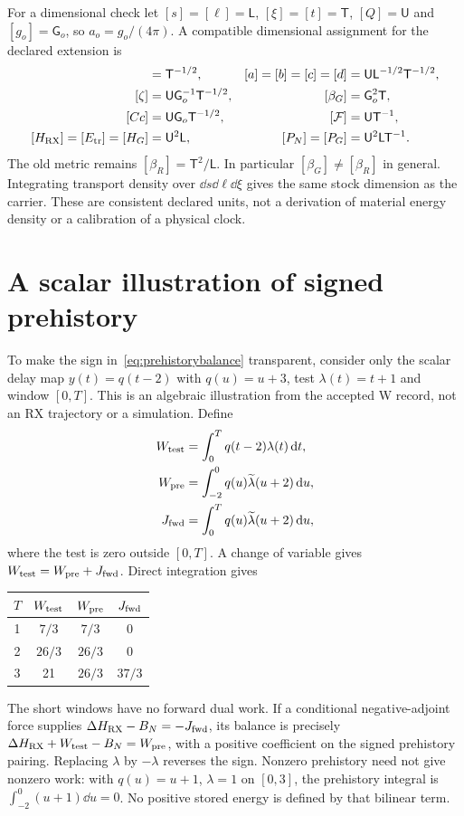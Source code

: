 For a dimensional check let $[s]=[\ell]=\mathsf L$, $[\xi]=[t]=\mathsf T$, $[Q]=\mathsf U$ and $[g_o]=\mathsf G_o$, so $a_o=g_o/(4\pi)$. A compatible dimensional assignment for the declared extension is
\begin{align}
[\kappa]&=\mathsf T^{-1/2},&
[a]=[b]=[c]=[d]&=\mathsf U\mathsf L^{-1/2}\mathsf T^{-1/2},\notag\\
[\zeta]&=\mathsf U\mathsf G_o^{-1}\mathsf T^{-1/2},&
[\beta_G]&=\mathsf G_o^2\mathsf T,\notag\\
[Cc]&=\mathsf U\mathsf G_o\mathsf T^{-1/2},&
[\FF]&=\mathsf U\mathsf T^{-1},\label{eq:units}\\
[H_{\rm RX}]=[E_{\rm tr}]=[H_G]&=\mathsf U^2\mathsf L,&
[P_N]=[P_G]&=\mathsf U^2\mathsf L\mathsf T^{-1}.\notag
\end{align}
The old metric remains $[\beta_R]=\mathsf T^2/\mathsf L$. In particular $[\beta_G]\ne[\beta_R]$ in general. Integrating transport density over $\dd s\dd\ell\dd\xi$ gives the same stock dimension as the carrier. These are consistent declared units, not a derivation of material energy density or a calibration of a physical clock.

\section{A scalar illustration of signed prehistory}\label{app:example}
To make the sign in~\eqref{eq:prehistorybalance} transparent, consider only the scalar delay map $y(t)=q(t-2)$ with $q(u)=u+3$, test $\lambda(t)=t+1$ and window $[0,T]$. This is an algebraic illustration from the accepted W record, not an RX trajectory or a simulation. Define
\begin{align*}
W_{\rm test}&=\int_0^Tq(t-2)\lambda(t)\,\mathrm d t,\\
W_{\rm pre}&=\int_{-2}^0q(u)\widetilde\lambda(u+2)\,\mathrm d u,\\
J_{\rm fwd}&=\int_0^Tq(u)\widetilde\lambda(u+2)\,\mathrm d u,
\end{align*}
where the test is zero outside $[0,T]$. A change of variable gives $W_{\rm test}=W_{\rm pre}+J_{\rm fwd}$. Direct integration gives
\begin{center}\begin{tabular}{cccc}\toprule
$T$ & $W_{\rm test}$ & $W_{\rm pre}$ & $J_{\rm fwd}$\\\midrule
1 & $7/3$ & $7/3$ & 0\\
2 & $26/3$ & $26/3$ & 0\\
3 & 21 & $26/3$ & $37/3$\\\bottomrule
\end{tabular}\end{center}
The short windows have no forward dual work. If a conditional negative-adjoint force supplies $\Delta H_{\rm RX}-B_N=-J_{\rm fwd}$, its balance is precisely $\Delta H_{\rm RX}+W_{\rm test}-B_N=W_{\rm pre}$, with a positive coefficient on the signed prehistory pairing. Replacing $\lambda$ by $-\lambda$ reverses the sign. Nonzero prehistory need not give nonzero work: with $q(u)=u+1$, $\lambda=1$ on $[0,3]$, the prehistory integral is $\int_{-2}^0(u+1)\dd u=0$. No positive stored energy is defined by that bilinear term.

